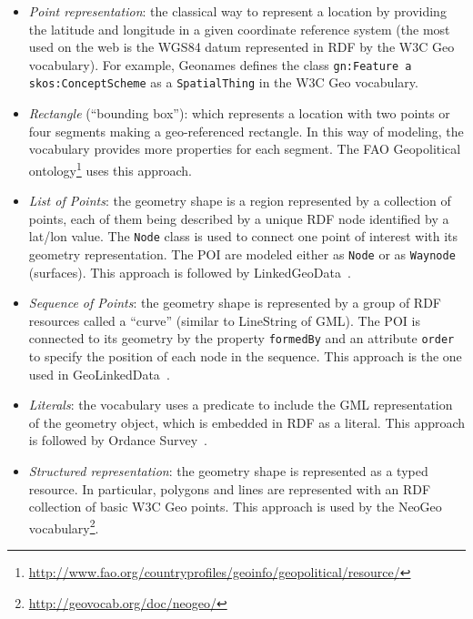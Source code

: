 \begin{itemize}
  \item \textit{Point representation}: the classical way to represent a location by providing the latitude and longitude in a given coordinate reference system (the most used on the web is the WGS84 datum represented in RDF by the W3C Geo vocabulary). For example, Geonames defines the class \texttt{gn:Feature a skos:ConceptScheme} as a \texttt{SpatialThing} in the W3C Geo vocabulary.
  \item \textit{Rectangle} (``bounding box''): which represents a location with two points or four segments making a geo-referenced rectangle. In this way of modeling, the vocabulary provides more properties for each segment. The FAO Geopolitical ontology\footnote{\url{http://www.fao.org/countryprofiles/geoinfo/geopolitical/resource/}} uses this approach.
  \item \textit{List of Points}: the geometry shape is a region represented by a collection of points, each of them being described by a unique RDF node identified by a lat/lon value. The \texttt{Node} class is used to connect one point of interest with its geometry representation. The POI are modeled either as \texttt{Node} or as \texttt{Waynode} (surfaces). This approach is followed by LinkedGeoData~\cite{linkedgeodata}.
  \item \textit{Sequence of Points}: the geometry shape is represented by a group of RDF resources called a ``curve'' (similar to LineString of GML). The POI is connected to its geometry by the property \texttt{formedBy} and an attribute \texttt{order} to specify the position of each node in the sequence. This approach is the one used in GeoLinkedData~\cite{deLeon2010}.
  \item \textit{Literals}: the vocabulary uses a predicate to include the GML representation of the geometry object, which is embedded in RDF as a literal. This approach is followed by Ordance Survey~\cite{Goodwin2008}.
  \item \textit{Structured representation}: the geometry shape is represented as a typed resource. In particular, polygons and lines are represented with an RDF collection of basic W3C Geo points. This approach is used by the NeoGeo vocabulary\footnote{\url{http://geovocab.org/doc/neogeo/}}.
\end{itemize}

